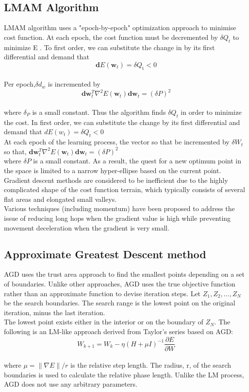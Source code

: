 \documentclass[journal]{IEEEtran}
\begin{document}
\subsection{LMAM Algorithm}
LMAM algorithm uses a "epoch-by-epoch" optimization approach to minimise cost function. At each epoch, the cost function must be decremented by $\delta Q_{t}$ to minimize E \cite{ampazis2002two}.
To first order, we can substitute the change in by its first differential and demand that 
$$ \boldsymbol{d} E\left(\boldsymbol{w}_{t}\right)=\delta Q_{\mathrm{t}}<0 $$ \\
Per epoch,$ \delta d_{w} $ is incremented by 
\\ $$ \boldsymbol{d} \boldsymbol{w}_{t}^{T} \nabla^{2} E\left(\boldsymbol{w}_{t}\right) \boldsymbol{d} \boldsymbol{w}_{t}=(\delta P)^{2} $$
\\ 
where $\delta_{P}$ is a small constant.
Thus the algorithm finds $ \delta Q_{t} $ in order to minimize the cost. In first order, we can substitute the change by its first differential and demand that $ d E\left(w_{t}\right)=\delta Q_{t}<0 $ \\
At each epoch of the learning process, the vector so that be incremented by  $ \delta W_{t} $ so that, 
$ \boldsymbol{d} \boldsymbol{w}_{t}^{T} \nabla^{2} E\left(\boldsymbol{w}_{t}\right) \boldsymbol{d} \boldsymbol{w}_{t}=(\delta P)^{2} $ \\
where $ \delta P $ is a small constant. As a result, the quest for a new optimum point in the space is limited to a narrow hyper-ellipse based on the current point. Gradient descent methods are considered to be inefficient due to the highly complicated shape of the cost function terrain, which typically consists of several flat areas and elongated small valleys. \\
Various techniques (including momentum) have been proposed to address the issue of reducing long hops when the gradient value is high while preventing movement deceleration when the gradient is very small.

\subsection{Approximate Greatest Descent method}
 AGD \cite{goh2011approximate} uses the trust area approach to find the smallest points depending on a set of boundaries. Unlike other approaches, AGD uses the true objective function rather than an approximate function to devise iteration steps. Let  $ Z_{1}, Z_{2},..., Z_{N}$ be the search boundaries. The search range is the lowest point on the original iteration, minus the last iteration. \\
The lowest point exists either in the interior or on the boundary of $Z_{N}$. The following is an LM-like approach derived from Taylor's series based on AGD: \\
$$ W_{k+1}=W_{k}-\eta(H+\mu I)^{-1} \frac{\partial E}{\partial W} $$ \\
where $ \mu=\|\nabla E\| / r $ is the relative step length. The radius, r, of the search boundaries is used to calculate the relative phase length. Unlike the LM process, AGD does not use any arbitrary parameters. 
\end{document}
